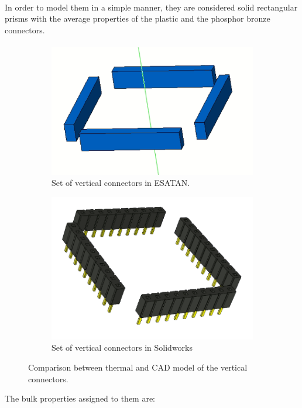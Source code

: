 \paragraph{}

In order to model them in a simple manner, they are considered solid rectangular prisms with the average
properties of the plastic and the phosphor bronze connectors.

\paragraph{}

\begin{figure}[H]
  \centering
  \begin{subfigure}{.5\textwidth}
    \centering
    \includegraphics[width=.5\linewidth]{res/img/5_simulationanalisys/Comparisons/ESATAN/verticalconnectors.PNG}
    \caption{Set of vertical connectors in ESATAN.}
    \label{fig:verticalconnectors}
  \end{subfigure}%
  \begin{subfigure}{.5\textwidth}
    \centering
    \includegraphics[width=.5\linewidth]{res/img/5_simulationanalisys/Comparisons/SLDW/verticalconectorssolid.PNG}
    \caption{Set of vertical connectors in Solidworks}
    \label{fig:verticalconectorssolid}
  \end{subfigure}
  \caption{Comparison between thermal and CAD model of the vertical connectors.}
  \label{fig:verticalconectorsim}
\end{figure}

The bulk properties assigned to them are:

